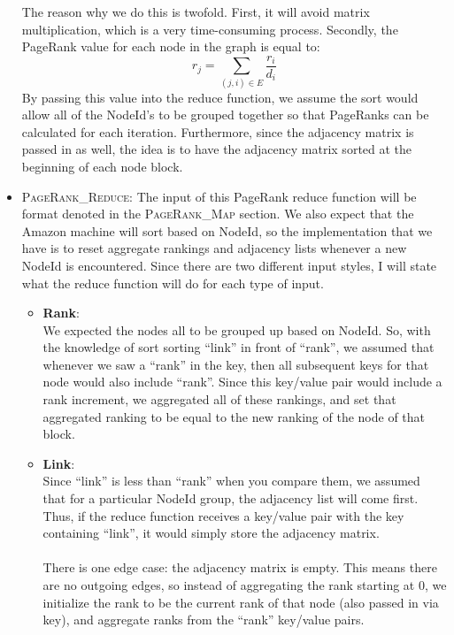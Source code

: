 \documentclass{article}
\begin{document}
\begin{itemize}
        The reason why we do this is twofold. First, it will avoid matrix multiplication, which is a very time-consuming process. Secondly, the PageRank value for each node in the graph is equal to:
        $$ r_j = \sum_{(j, i) \in E} \frac{r_i}{d_i} $$
        By passing this value into the reduce function, we assume the sort would allow all of the NodeId's to be grouped together so that PageRanks can be calculated for each iteration. Furthermore, since the adjacency matrix is passed in as well, the idea is to have the adjacency matrix sorted at the beginning of each node block.
        \vspace{5mm}
        \item \textsc{PageRank\_Reduce}: 
        The input of this PageRank reduce function will be format denoted in the \textsc{PageRank\_Map} section. We also expect that the Amazon machine will sort based on NodeId, so the implementation that we have is to reset aggregate rankings and adjacency lists whenever a new NodeId is encountered. Since there are two different input styles, I will state what the reduce function will do for each type of input.
        \begin{itemize}
            \item \textbf{Rank}: \\
                We expected the nodes all to be grouped up based on NodeId. So, with the knowledge of sort sorting ``link'' in front of ``rank'', we assumed that whenever we saw a ``rank'' in the key, then all subsequent keys for that node would also include ``rank''. Since this key/value pair would include 
                a rank increment, we aggregated all of these rankings, and set that aggregated ranking to be equal to the new ranking of the node of that block. 
                
            \item \textbf{Link}: \\
                Since ``link'' is less than ``rank'' when you compare them, we assumed that for a particular NodeId group, the adjacency list will come first. Thus, if the reduce function receives a key/value pair with the key containing ``link'', it would simply store the adjacency matrix.
                \\ \\
                There is one edge case: the adjacency matrix is empty. This means there are no outgoing edges, so instead of aggregating the rank starting at 0, we initialize the rank to be the current rank of that node (also passed in via key), and aggregate ranks from the ``rank'' key/value pairs.
        \end{itemize}


\end{itemize}
\end{document}
